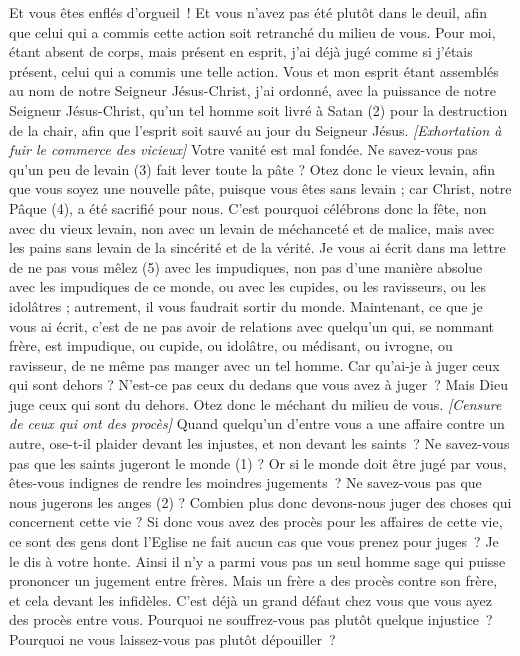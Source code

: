 \begin{multicols}{2}
Et vous êtes enflés d'orgueil ! Et vous n'avez pas été plutôt dans le deuil, afin que celui qui a commis cette action soit retranché du milieu de vous.
Pour moi, étant absent de corps, mais présent en esprit, j'ai déjà jugé comme si j'étais présent, celui qui a commis une telle action.
Vous et mon esprit étant assemblés au nom de notre Seigneur Jésus-Christ, j'ai ordonné, avec la puissance de notre Seigneur Jésus-Christ,
qu'un tel homme soit livré à Satan (2)  pour la destruction de la chair, afin que l'esprit soit sauvé au jour du Seigneur Jésus.
\textit{[Exhortation à fuir le commerce des vicieux]}
Votre vanité est mal fondée. Ne savez-vous pas qu'un peu de levain (3) fait lever toute la pâte ?
Otez donc le vieux levain, afin que vous soyez une nouvelle pâte, puisque vous êtes sans levain ; car Christ, notre Pâque (4), a été sacrifié pour nous.
C'est pourquoi célébrons donc la fête, non avec du vieux levain, non avec un levain de méchanceté et de malice, mais avec les pains sans levain de la sincérité et de la vérité.
Je vous ai écrit dans ma lettre de ne pas vous mêlez (5) avec les impudiques,
non pas d’une manière absolue avec les impudiques de ce monde, ou avec les cupides, ou les ravisseurs, ou les idolâtres ; autrement, il vous faudrait sortir du monde.
Maintenant, ce que je vous ai écrit, c’est de ne pas avoir de relations avec quelqu’un qui, se nommant frère, est impudique, ou cupide, ou idolâtre, ou médisant, ou ivrogne, ou ravisseur, de ne même pas manger avec un tel homme.
Car qu'ai-je à juger ceux qui sont dehors ? N’est-ce pas ceux du dedans que vous avez à juger ?
Mais Dieu juge ceux qui sont du dehors. Otez donc le méchant du milieu de vous.
\textit{[Censure de ceux qui ont des procès]}
\VerseOne{}Quand quelqu'un d'entre vous a une affaire contre un autre, ose-t-il plaider devant les injustes, et non devant les saints ?
Ne savez-vous pas que les saints jugeront le monde (1) ? Or si le monde doit être jugé par vous, êtes-vous indignes de rendre les moindres jugements ?
Ne savez-vous pas que nous jugerons les anges (2) ? Combien plus donc devons-nous juger des choses qui concernent cette vie ?
Si donc vous avez des procès pour les affaires de cette vie, ce sont des gens dont l’Eglise ne fait aucun cas que vous prenez pour juges ?
Je le dis à votre honte. Ainsi il n’y a parmi vous pas un seul homme sage qui puisse prononcer un jugement entre frères.
Mais un frère a des procès contre son frère, et cela devant les infidèles.
C'est déjà un grand défaut chez vous que vous ayez des procès entre vous. Pourquoi ne souffrez-vous pas plutôt quelque injustice ? Pourquoi ne vous laissez-vous pas plutôt dépouiller ?

\end{multicols}
